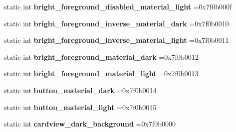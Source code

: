 \begin{DoxyCompactItemize}
static int {\bfseries bright\+\_\+foreground\+\_\+disabled\+\_\+material\+\_\+light} =0x7f0b000f
\item 
\mbox{\label{classandroid_1_1support_1_1v7_1_1appcompat_1_1R_1_1color_a0e1c32913a00310192ecc7766ea5802a}} 
static int {\bfseries bright\+\_\+foreground\+\_\+inverse\+\_\+material\+\_\+dark} =0x7f0b0010
\item 
\mbox{\label{classandroid_1_1support_1_1v7_1_1appcompat_1_1R_1_1color_a03f1c167d2cf85ee8cafe5f62fa3ffcf}} 
static int {\bfseries bright\+\_\+foreground\+\_\+inverse\+\_\+material\+\_\+light} =0x7f0b0011
\item 
\mbox{\label{classandroid_1_1support_1_1v7_1_1appcompat_1_1R_1_1color_a09a02510d4d6ee55cdac59486fe0728b}} 
static int {\bfseries bright\+\_\+foreground\+\_\+material\+\_\+dark} =0x7f0b0012
\item 
\mbox{\label{classandroid_1_1support_1_1v7_1_1appcompat_1_1R_1_1color_a3ae45d67824c494a009d0abec3b25555}} 
static int {\bfseries bright\+\_\+foreground\+\_\+material\+\_\+light} =0x7f0b0013
\item 
\mbox{\label{classandroid_1_1support_1_1v7_1_1appcompat_1_1R_1_1color_a22627adcb1cefb2a8794ea3606bfa725}} 
static int {\bfseries button\+\_\+material\+\_\+dark} =0x7f0b0014
\item 
\mbox{\label{classandroid_1_1support_1_1v7_1_1appcompat_1_1R_1_1color_acdb79ac36488b722bb9c930fc759e2e8}} 
static int {\bfseries button\+\_\+material\+\_\+light} =0x7f0b0015
\item 
\mbox{\label{classandroid_1_1support_1_1v7_1_1appcompat_1_1R_1_1color_a4fa9e8140007e186c046772c111810a6}} 
static int {\bfseries cardview\+\_\+dark\+\_\+background} =0x7f0b0000
\item 
\mbox{\label{classandroid_1_1support_1_1v7_1_1appcompat_1_1R_1_1color_acf415bdd3644ea10518ddc4627a29456}} 

\end{DoxyCompactItemize}
